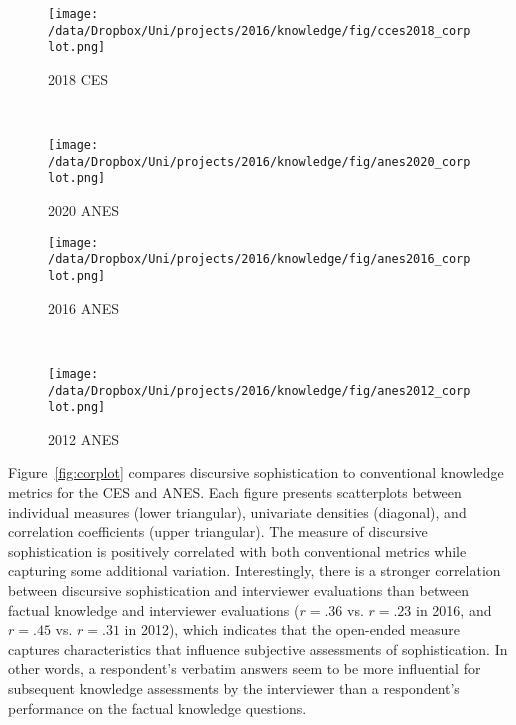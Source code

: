 \begin{figure*}[ht]
    \centering
    \begin{subfigure}[t]{0.45\textwidth}
    	\centering
    	\texttt{[image: /data/Dropbox/Uni/projects/2016/knowledge/fig/cces2018\_corplot.png]}
    	\caption{2018 CES}
    \end{subfigure}
	~~
    \begin{subfigure}[t]{0.45\textwidth}
    	\centering
    	\texttt{[image: /data/Dropbox/Uni/projects/2016/knowledge/fig/anes2020\_corplot.png]}
    	\caption{2020 ANES}
    \end{subfigure}
    \begin{subfigure}[t]{0.45\textwidth}
    	\centering
    	\texttt{[image: /data/Dropbox/Uni/projects/2016/knowledge/fig/anes2016\_corplot.png]}
    	\caption{2016 ANES}
    \end{subfigure}
	~~
    \begin{subfigure}[t]{0.45\textwidth}
        \centering
        \texttt{[image: /data/Dropbox/Uni/projects/2016/knowledge/fig/anes2012\_corplot.png]}
        \caption{2012 ANES}
    \end{subfigure}%
    \caption[Correlation matrix of discursive sophistication and conventional political knowledge metrics]{Correlation matrix of discursive sophistication and conventional political knowledge metrics. The plots on the diagonal display univariate densities for each variable. The panels in the lower triangular display the scatter plot of two measures as well as a linear fit. The upper triangular displays the correlation coefficient. All correlations reported are statistically significant with $p<.05$.}\label{fig:corplot}
\end{figure*}

Figure~\ref{fig:corplot} compares discursive sophistication to conventional knowledge metrics for the CES and ANES. Each figure presents scatterplots between individual measures (lower triangular), univariate densities (diagonal), and correlation coefficients (upper triangular). The measure of discursive sophistication is positively correlated with both conventional metrics while capturing some additional variation. Interestingly, there is a stronger correlation between discursive sophistication and interviewer evaluations than between factual knowledge and interviewer evaluations ($r=.36$ vs. $r=.23$ in 2016, and $r=.45$ vs. $r=.31$ in 2012), which indicates that the open-ended measure captures characteristics that influence subjective assessments of sophistication. In other words, a respondent's verbatim answers seem to be more influential for subsequent knowledge assessments by the interviewer than a respondent's performance on the factual knowledge questions.

